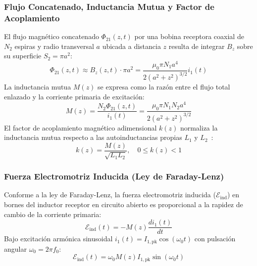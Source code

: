 \subsubsection{Flujo Concatenado, Inductancia Mutua y Factor de Acoplamiento}
El flujo magnético concatenado $\Phi_{21}(z, t)$ por una bobina receptora coaxial de $N_2$ espiras y radio transversal $a$ ubicada a distancia $z$ resulta de integrar $B_z$ sobre su superficie $S_2 = \pi a^2$:
\begin{equation}
    \Phi_{21}(z, t) \approx B_z(z, t) \cdot \pi a^2 = \frac{\mu_0 \pi N_1 a^4}{2 (a^2 + z^2)^{3/2}} i_1(t)
    \label{eq:flujo_concatenado}
\end{equation}
La inductancia mutua $M(z)$ se expresa como la razón entre el flujo total enlazado y la corriente primaria de excitación:
\begin{equation}
    M(z) = \frac{N_2 \Phi_{21}(z, t)}{i_1(t)} = \frac{\mu_0 \pi N_1 N_2 a^4}{2 (a^2 + z^2)^{3/2}}
    \label{eq:inductancia_mutua}
\end{equation}
El factor de acoplamiento magnético adimensional $k(z)$ normaliza la inductancia mutua respecto a las autoinductancias propias $L_1$ y $L_2$~\cite{lee2003antenna}:
\begin{equation}
    k(z) = \frac{M(z)}{\sqrt{L_1 L_2}}, \quad 0 \le k(z) < 1
    \label{eq:factor_acoplamiento}
\end{equation}

\subsubsection{Fuerza Electromotriz Inducida (Ley de Faraday-Lenz)}
Conforme a la ley de Faraday-Lenz, la fuerza electromotriz inducida ($\mathcal{E}_{\text{ind}}$) en bornes del inductor receptor en circuito abierto es proporcional a la rapidez de cambio de la corriente primaria:
\begin{equation}
    \mathcal{E}_{\text{ind}}(t) = - M(z) \frac{d i_1(t)}{dt}
    \label{eq:faraday}
\end{equation}
Bajo excitación armónica sinusoidal $i_1(t) = I_{1,\text{pk}} \cos(\omega_0 t)$ con pulsación angular $\omega_0 = 2\pi f_0$:
\begin{equation}
    \mathcal{E}_{\text{ind}}(t) = \omega_0 M(z) I_{1,\text{pk}} \sin(\omega_0 t)
    \label{eq:fem_armonica}
\end{equation}

